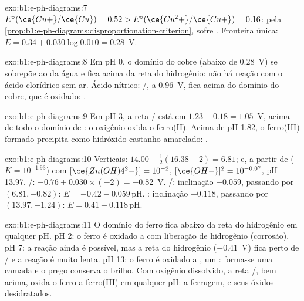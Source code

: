 \begin{solution}{exo:b1:e-ph-diagrams:7}
$E^\circ(\ce{Cu+}/\ce{Cu}) = 0.52 > E^\circ(\ce{Cu^2+}/\ce{Cu+}) = 0.16$:
pela \cref{prop:b1:e-ph-diagrams:disproportionation-criterion}, 
sofre . Fronteira única: $E = 0.34 + 0.030\log 0.010 =
0.28$~V.
\end{solution}

\begin{solution}{exo:b1:e-ph-diagrams:8}
Em pH 0, o domínio do cobre (abaixo de 0.28~V) se sobrepõe ao da água e
fica acima da reta do hidrogênio: não há reação com o ácido clorídrico
sem ar. Ácido nítrico: /, a 0.96~V, fica acima do domínio
do cobre, que é oxidado:
.
\end{solution}

\begin{solution}{exo:b1:e-ph-diagrams:9}
Em pH 3, a reta / está em $1.23 - 0.18 = 1.05$~V, acima de
todo o domínio de : o oxigênio oxida o ferro(II). Acima de pH
1.82, o ferro(III) formado precipita como hidróxido castanho-amarelado:
.
\end{solution}

\begin{solution}{exo:b1:e-ph-diagrams:10}
Verticais: $14.00 - \frac12(16.38 - 2) = 6.81$; e, a partir de
 ($K = 10^{-1.93}$) com
$[\ce{Zn(OH)4^2-}] = 10^{-2}$, $[\ce{OH-}]^2 = 10^{-0.07}$, pH 13.97.
/: $-0.76 + 0.030 \times (-2) = -0.82$~V. /:
inclinação $-0.059$, passando por $(6.81, -0.82)$: $E = -0.42 - 0.059\,\mathrm{pH}$.
: inclinação $-0.118$, passando por
$(13.97, -1.24)$: $E = 0.41 - 0.118\,\mathrm{pH}$.
\end{solution}

\begin{solution}{exo:b1:e-ph-diagrams:11}
O domínio do ferro fica abaixo da reta do hidrogênio em qualquer pH. pH
2: o ferro é oxidado a  com liberação de hidrogênio
(corrosão). pH 7: a reação ainda é possível, mas a reta do hidrogênio
($-0.41$~V) fica perto de / e a reação é muito lenta. pH
13: o ferro é oxidado a , um : forma-se
uma camada e o prego conserva o brilho. Com oxigênio dissolvido, a reta
/, bem acima, oxida o ferro a ferro(III) em qualquer pH: a
ferrugem,  e seus óxidos desidratados.
\end{solution}

